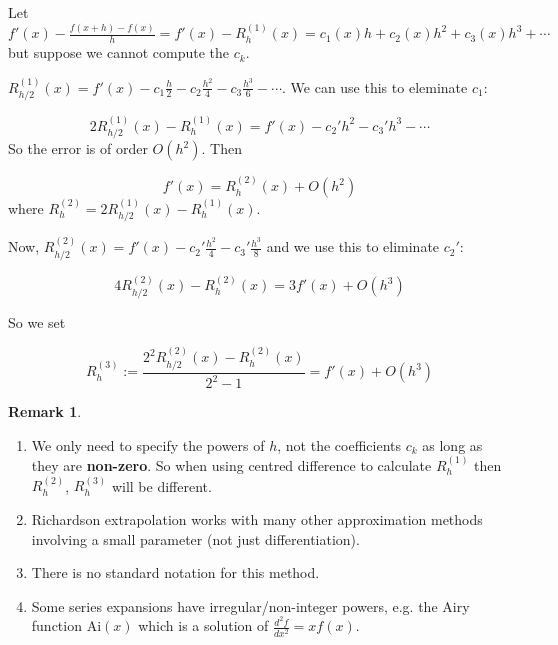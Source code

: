 \documentclass[12pt,a4paper]{article}
\theoremstyle{definition}
\newtheorem*{remark}{Remark}
\begin{document}
Let $f'(x) - \frac{f(x + h) - f(x)}{h} = f'(x) - R_h^{(1)} (x) = c_1(x) h + c_2(x) h^2 + c_3(x) h^3 + \cdots$ but suppose we cannot compute the $c_k$.

$R_{h / 2}^{(1)} (x) = f'(x) - c_1 \frac{h}{2} - c_2 \frac{h^2}{4} - c_3 \frac{h^3}{6} - \cdots$. We can use this to eleminate $c_1$:

\[ 2 R_{h / 2}^{(1)} (x) - R_h^{(1)} (x) = f'(x) - c_2' h^2 - c_3' h^3 - \cdots \]
So the error is of order $O(h^2)$. Then

\[ f'(x) = R_h^{(2)} (x) + O(h^2) \]
where $R_h^{(2)} = 2 R_{h / 2}^{(1)} (x) - R_h^{(1)} (x)$.

Now, $R_{h / 2}^{(2)} (x) = f'(x) - c_2' \frac{h^2}{4} - c_3' \frac{h^3}{8}$ and we use this to eliminate $c_2'$:

\[ 4 R_{h / 2}^{(2)} (x) - R_h^{(2)} (x) = 3 f'(x) + O(h^3) \]

So we set

\[ R_h^{(3)} := \frac{2^2 R_{h / 2}^{(2)} (x) - R_h^{(2)}(x)}{2^2 - 1} = f'(x) + O(h^3) \]

\begin{remark}
	\hfill
	\begin{enumerate}
		\item We only need to specify the powers of $h$, not the coefficients $c_k$ as long as they are \textbf{non-zero}. So when using centred difference to calculate $R_h^{(1)}$ then $R_h^{(2)}$, $R_h^{(3)}$ will be different.
		\item Richardson extrapolation works with many other approximation methods involving a small parameter (not just differentiation).
		\item There is no standard notation for this method.
		\item Some series expansions have irregular/non-integer powers, e.g. the Airy function $\text{Ai}(x)$ which is a solution of $\frac{d^2 f}{dx^2} = x f(x)$.
	\end{enumerate}
\end{remark}
\end{document}
